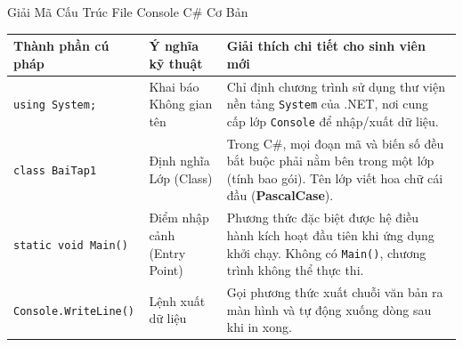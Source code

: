 \documentclass[aspectratio=169, 10pt]{beamer}
\begin{document}
\begin{frame}{Giải Mã Cấu Trúc File Console C\# Cơ Bản}
  \begin{table}[h]
    \centering
    \small
    \begin{tabularx}{\textwidth}{lp{3.5cm}X}
      \toprule
      \textbf{Thành phần cú pháp} & \textbf{Ý nghĩa kỹ thuật} & \textbf{Giải thích chi tiết cho sinh viên mới} \\
      \midrule
      \texttt{using System;} & Khai báo Không gian tên & Chỉ định chương trình sử dụng thư viện nền tảng \texttt{System} của .NET, nơi cung cấp lớp \texttt{Console} để nhập/xuất dữ liệu. \\
      \addlinespace
      \texttt{class BaiTap1} & Định nghĩa Lớp (Class) & Trong C\#, mọi đoạn mã và biến số đều bắt buộc phải nằm bên trong một lớp (tính bao gói). Tên lớp viết hoa chữ cái đầu (\textbf{PascalCase}). \\
      \addlinespace
      \texttt{static void Main()} & Điểm nhập cảnh (Entry Point) & Phương thức đặc biệt được hệ điều hành kích hoạt đầu tiên khi ứng dụng khởi chạy. Không có \texttt{Main()}, chương trình không thể thực thi. \\
      \addlinespace
      \texttt{Console.WriteLine()} & Lệnh xuất dữ liệu & Gọi phương thức xuất chuỗi văn bản ra màn hình và tự động xuống dòng sau khi in xong. \\
      \bottomrule
    \end{tabularx}
  \end{table}
\end{frame}
\end{document}
